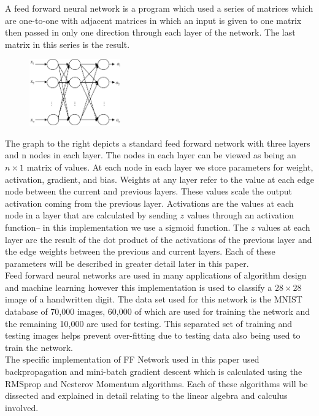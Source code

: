 \documentclass[12pt]{article}
\theoremstyle{definition}
\theoremstyle{plain}
\begin{document}
A feed forward neural network is a program which used a series of matrices which are one-to-one with adjacent matrices in which an input is given to one matrix then passed in only one direction through each layer of the network. The last matrix in this series is the result.\linebreak
\begin{figure}
	\centering
	\includegraphics[width=0.35\textwidth]{FFNN.jpg}
\end{figure}

The graph to the right depicts a standard feed forward network with three layers and n nodes in each layer. The nodes in each layer can be viewed as being an $n\times 1$ matrix of values. At each node in each layer we store parameters for weight, activation, gradient, and bias. Weights at any layer refer to the value at each edge node between the current and previous layers. These values scale the output activation coming from the previous layer. Activations are the values at each node in a layer that are calculated by sending $z$ values through an activation function-- in this implementation we use a sigmoid function. The $z$ values at each layer are the result of the dot product of the activations of the previous layer and the edge weights between the previous and current layers. Each of these parameters will be described in greater detail later in this paper.\\

Feed forward neural networks are used in many applications of algorithm design and machine learning however this implementation is used to classify a $28\times 28$ image of a handwritten digit. The data set used for this network is the MNIST database of 70,000 images, 60,000 of which are used for training the network and the remaining 10,000 are used for testing. This separated set of training and testing images helps prevent over-fitting due to testing data also being used to train the network.\\

The specific implementation of FF Network used in this paper used backpropagation and mini-batch gradient descent which is calculated using the RMSprop and Nesterov Momentum algorithms. Each of these algorithms will be dissected and explained in detail relating to the linear algebra and calculus involved.
\end{document}
